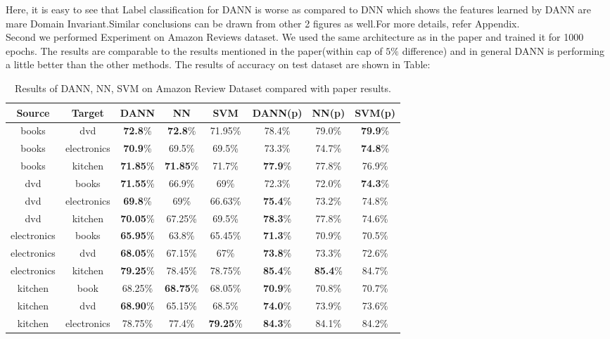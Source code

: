\documentclass{article}
\begin{document}
Here, it is easy to see that Label classification for DANN is worse as compared to DNN which shows the features learned by DANN are mare Domain Invariant.Similar conclusions can be drawn from other 2 figures as well.For more details, refer Appendix. \\
Second we performed Experiment on Amazon Reviews dataset. We used the same architecture as in the paper and trained it for 1000 epochs. The results are comparable to the results mentioned in the paper(within cap of $5\%$ difference) and in general DANN is performing a little better than the other methods. The results of accuracy on test dataset are shown in Table:
\begin{table}[H]
  \centering
  \begin{tabular}{|c|c|c|c|c|c|c|c|}
  \hline
  Source & Target & DANN & NN & SVM & DANN(p) & NN(p) & SVM(p) \\ \hline
  books & dvd & \textbf{72.8}\% & \textbf{72.8}\% & 71.95\% & 78.4\% & 79.0\% & \textbf{79.9}\% \\ \hline
  books & electronics & \textbf{70.9}\% & 69.5\% & 69.5\% & 73.3\% & 74.7\% & \textbf{74.8}\% \\ \hline
  books & kitchen & \textbf{71.85}\% & \textbf{71.85}\% & 71.7\% & \textbf{77.9}\% & 77.8\% & 76.9\% \\ \hline
  dvd & books & \textbf{71.55}\% & 66.9\% & 69\% & 72.3\% & 72.0\% & \textbf{74.3}\% \\ \hline
  dvd & electronics & \textbf{69.8}\% & 69\% & 66.63\% & \textbf{75.4}\% & 73.2\% & 74.8\% \\ \hline
  dvd & kitchen & \textbf{70.05}\% & 67.25\% & 69.5\% & \textbf{78.3}\% & 77.8\% & 74.6\% \\ \hline
  electronics & books & \textbf{65.95}\% & 63.8\% & 65.45\% & \textbf{71.3}\% & 70.9\% & 70.5\% \\ \hline
  electronics & dvd & \textbf{68.05}\% & 67.15\% & 67\% & \textbf{73.8}\% & 73.3\% & 72.6\% \\ \hline
  electronics & kitchen & \textbf{79.25}\% & 78.45\% & 78.75\% & \textbf{85.4}\% & \textbf{85.4}\% & 84.7\% \\ \hline
  kitchen & book & 68.25\% & \textbf{68.75}\% & 68.05\% & \textbf{70.9}\% & 70.8\% & 70.7\% \\ \hline
  kitchen & dvd & \textbf{68.90}\% & 65.15\% & 68.5\% & \textbf{74.0}\% & 73.9\% & 73.6\% \\ \hline
  kitchen & electronics & 78.75\% & 77.4\% & \textbf{79.25}\% & \textbf{84.3}\% & 84.1\% & 84.2\% \\ \hline
  \end{tabular}
  \caption{Results of DANN, NN, SVM on Amazon Review Dataset compared with paper results.}
  \label{tab:sample_table}
  \end{table}
\end{document}
